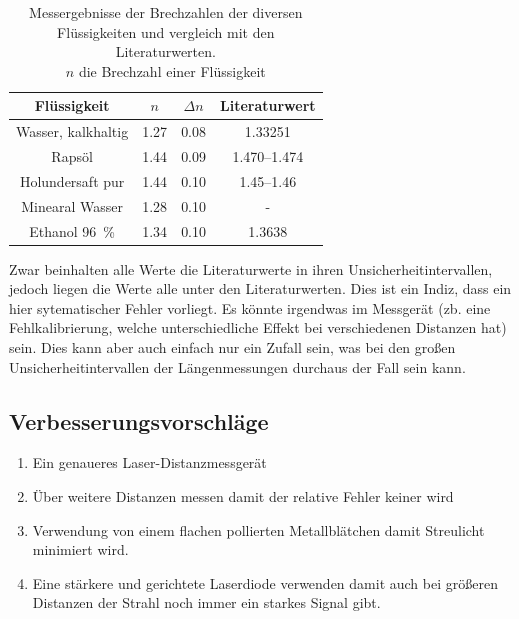\documentclass[11pt,ngerman]{scrartcl}
\begin{document}
\begin{table}[H]
    \centering
    \caption{Messergebnisse der Brechzahlen der diversen Flüssigkeiten und vergleich mit den Literaturwerten.\\
    $n$ die Brechzahl einer Flüssigkeit}
    \label{tab:ergebnisse}
    \begin{tabular}{c|S|S|S}
        Flüssigkeit          & {$n$} & {$\Delta n$} & {Literaturwert}                         \\ \hline
        Wasser, kalkhaltig   & 1.27  & 0.08         & 1.33251 \cite{brechzahlwasser} \\
        Rapsöl               & 1.44  & 0.09         & \numrange{1.470}{1.474} \cite{brechzahloele}  \\
        Holundersaft pur     & 1.44  & 0.10         & \numrange{1.45}{1.46} \cite{brechzahlsirup} \\
        Minearal Wasser      & 1.28  & 0.10         & { - } \\
        Ethanol \SI{96}{\percent}      & 1.34  & 0.10         & 1.3638 \cite{brechzahlethanol} \\
    \end{tabular}
\end{table}

Zwar beinhalten alle Werte die Literaturwerte in ihren Unsicherheitintervallen,
jedoch liegen die Werte alle unter den Literaturwerten. Dies ist ein Indiz, dass ein
hier sytematischer Fehler vorliegt. Es könnte irgendwas im Messgerät (zb. eine Fehlkalibrierung, welche unterschiedliche Effekt bei
verschiedenen Distanzen hat) sein. Dies kann aber auch einfach nur ein Zufall
sein, was bei den großen Unsicherheitintervallen der Längenmessungen 
durchaus der Fall sein kann. 

\subsection{Verbesserungsvorschläge}
\begin{enumerate}
    \item Ein genaueres Laser-Distanzmessgerät
    \item Über weitere Distanzen messen damit der relative Fehler keiner wird
    \item Verwendung von einem flachen pollierten Metallblätchen damit Streulicht minimiert wird.
    \item Eine stärkere und gerichtete Laserdiode verwenden damit auch bei größeren Distanzen der
        Strahl noch immer ein starkes Signal gibt.
\end{enumerate}
\end{document}
